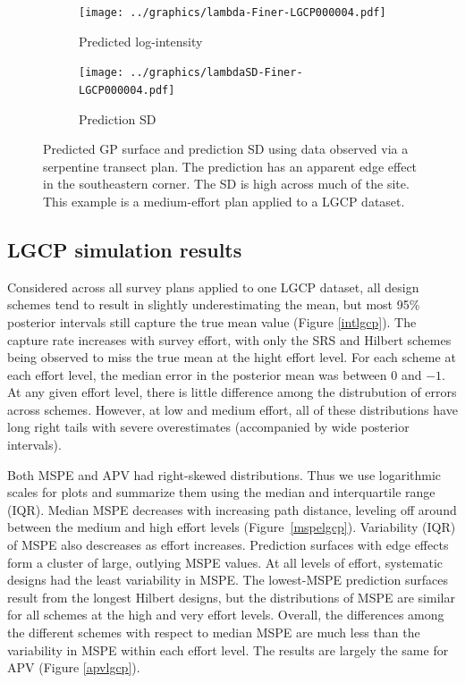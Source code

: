 \documentclass[review]{elsarticle}
\begin{document}
\begin{figure}

\begin{subfigure}{5in}
\texttt{[image: ../graphics/lambda-Finer-LGCP000004.pdf]}
\caption{Predicted log-intensity}
\label{lambdafinerlgcp}
\end{subfigure}

\begin{subfigure}{5in}
\texttt{[image: ../graphics/lambdaSD-Finer-LGCP000004.pdf]}
\caption{Prediction SD}
\label{sdfinerlgcp}
\end{subfigure}

\caption{Predicted GP surface and prediction SD using data observed via a
serpentine transect plan. The prediction has an apparent edge effect in the
southeastern corner. The SD is high across much of the site. This example is
a medium-effort plan applied to a LGCP dataset.}
\label{finer}
\end{figure}


\subsection{LGCP simulation results}

Considered across all survey plans applied to one LGCP dataset, all design
schemes tend to result in slightly underestimating the mean, but most
95\% posterior intervals still capture the true mean value (Figure
\ref{intlgcp}). The capture rate increases with survey effort, with only
the SRS and Hilbert schemes being observed to miss the true mean at the
hight effort level. For each scheme at each effort level, the median
error in the posterior mean was between 0 and \(-1\). At any given effort
level, there is little difference among the distrubution of errors across
schemes. However, at low and medium effort, all of these distributions
have long right tails with severe overestimates (accompanied by wide
posterior intervals).

Both MSPE and APV had right-skewed distributions. Thus we use logarithmic
scales for plots and summarize them using the median and interquartile range
(IQR). Median MSPE decreases with increasing path distance, leveling off
around between the medium and high effort levels (Figure~\ref{mspelgcp}).
Variability (IQR) of MSPE also descreases as effort increases. Prediction
surfaces with edge effects form a cluster of large, outlying MSPE values. At
all levels of effort, systematic designs had the least variability in MSPE.
The lowest-MSPE prediction surfaces result from the longest Hilbert designs,
but the distributions of MSPE are similar for all schemes at the high and very
effort levels. Overall, the differences among the different schemes with
respect to median MSPE are much less than the variability in MSPE within each
effort level. The results are largely the same for APV (Figure \ref{apvlgcp}).
\end{document}
